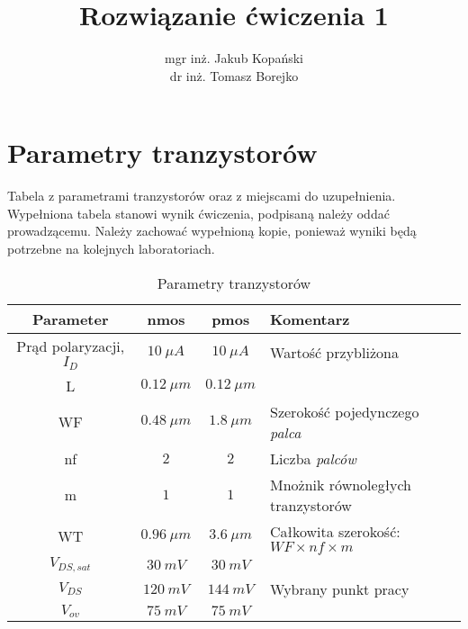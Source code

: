 \documentclass[twoside,pl,final]{labman}
\title{Rozwiązanie ćwiczenia 1}
\author{mgr inż. Jakub Kopański\\
dr inż. Tomasz Borejko}
\begin{document}
\maketitle

\appendix
\chapter{Parametry tranzystorów}
\label{app:devices}

Tabela z parametrami tranzystorów oraz z miejscami do uzupełnienia.
Wypełniona tabela stanowi wynik ćwiczenia,
podpisaną należy oddać prowadzącemu.
Należy zachować wypełnioną kopie,
ponieważ wyniki będą potrzebne na kolejnych laboratoriach.

\begin{table}[htbp]
  \centering
  \caption{Parametry tranzystorów}
  \label{tab:devices}
  \begin{tabular}{ || c | c | c | p{} || }
    \hline \hline
    Parameter & nmos & pmos & Komentarz \\
    \hline
    Prąd polaryzacji, $I_D$ & $10~\mu{}A$                  & $10~\mu{}A$    & Wartość przybliżona                          \\ \hline
    L                       & $0.12~\mu{}m$                & $0.12~\mu{}m$  &                                              \\ \hline
    WF                      & $0.48~\mu{}m$                & $1.8~\mu{}m$   & Szerokość pojedynczego \emph{palca}          \\ \hline
    nf                      & $2$                          & $2$            & Liczba \emph{palców}                         \\ \hline
    m                       & $1$                          & $1$            & Mnożnik równoległych tranzystorów            \\ \hline
    WT                      & $0.96~\mu{}m$                & $3.6~\mu{}m$   & Całkowita szerokość: $WF \times nf \times m$ \\ \hline
    $V_{DS,sat}$            & $30~mV$                      & $30~mV$        &                                              \\ \hline
    $V_{DS}$                & $120~mV$                     & $144~mV$       & Wybrany punkt pracy                          \\ \hline
    $V_{ov}$                & $75~mV$                      & $75~mV$        &                                              \\ \hline

\end{tabular}
\end{table}
\end{document}
